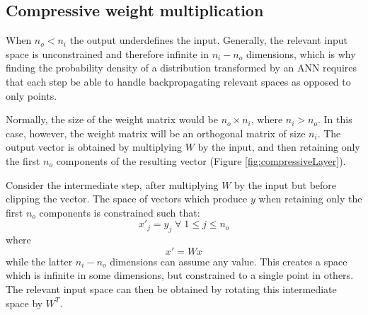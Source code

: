 \documentclass[../../main.tex]{subfiles}
\begin{document}
\subsection{Compressive weight multiplication} \label{subsection:compressiveWeightMultiplication}

When $n_o<n_i$ the output underdefines the input.
Generally, the relevant input space is unconstrained and therefore infinite in $n_i-n_o$ dimensions, which is why finding the probability density of a distribution transformed by an ANN requires that each step be able to handle backpropagating relevant spaces as opposed to only points.

Normally, the size of the weight matrix would be $n_o\times n_i$, where $n_i>n_o$.
In this case, however, the weight matrix will be an orthogonal matrix of size $n_i$.
The output vector is obtained by multiplying $W$ by the input, and then retaining only the first $n_o$ components of the resulting vector (Figure \ref{fig:compressiveLayer}).

Consider the intermediate step, after multiplying $W$ by the input but before clipping the vector.
The space of vectors which produce $y$ when retaining only the first $n_o$ components is constrained such that:
\begin{equation}
    x'_j=y_j\;\forall\;1\le j\le n_o
\end{equation}
where
\begin{equation}
    x'=Wx
\end{equation}
while the latter $n_i-n_o$ dimensions can assume any value.
This creates a space which is infinite in some dimensions, but constrained to a single point in others.
The relevant input space can then be obtained by rotating this intermediate space by $W^T$.
\end{document}

